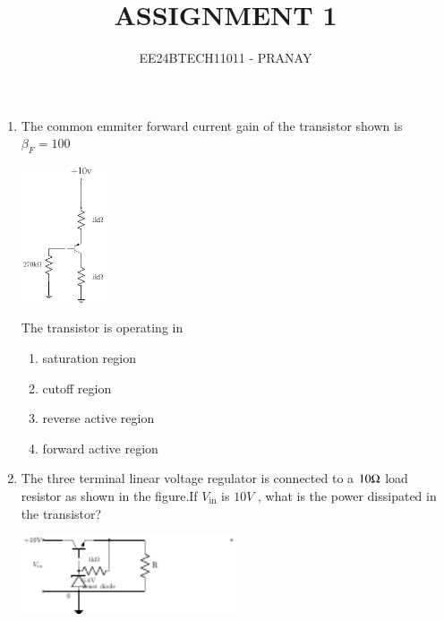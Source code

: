 \documentclass[journal,12pt,onecolumn]{IEEEtran}
\theoremstyle{remark}
\begin{document}

\vspace{3cm}

\title{ASSIGNMENT 1}
\author{EE24BTECH11011 - PRANAY}
\maketitle

\bigskip

\renewcommand{\thefigure}{\theenumi}
\renewcommand{\thetable}{\theenumi}
\begin{enumerate}
    \item The common emmiter forward current gain of the transistor shown is $\beta_F = 100$
	    \begin{center}
\includegraphics[width=0.2\textwidth]{figs/fig1/main} %
\end{center}
The transistor is operating in
 

\begin{enumerate}
    \item saturation region
    \item cutoff region
    \item reverse active region
    \item forward active region\\
\end{enumerate}
    \item The three terminal linear voltage regulator is connected to a $10 \ohm$ load resistor as shown in the figure.If $V_{\text{in}}$ is $10 V$ , what is the power dissipated in the transistor?
	     \begin{center}
\includegraphics[width=0.5\textwidth]{figs/fig2/main} %
\end{center}


\end{enumerate}
\end{document}
